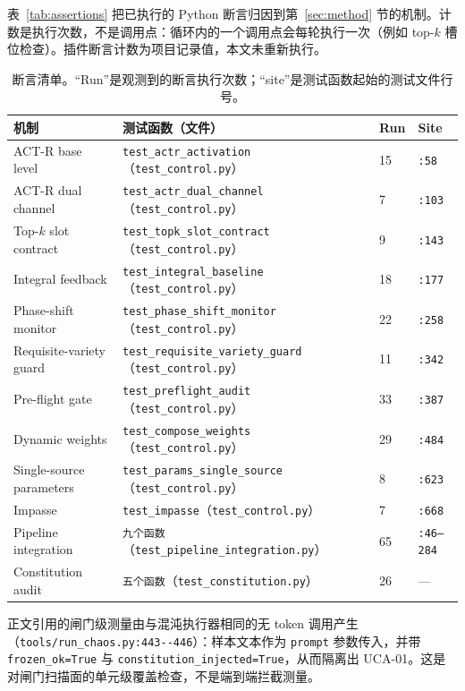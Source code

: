 表~\ref{tab:assertions} 把已执行的 Python 断言归因到第~\ref{sec:method} 节的机制。计数是执行次数，不是调用点：循环内的一个调用点会每轮执行一次（例如 top-$k$ 槽位检查）。插件断言计数为项目记录值，本文未重新执行。

\begin{table}[t]
\centering\footnotesize
\caption{断言清单。“Run”是观测到的断言执行次数；“site”是测试函数起始的测试文件行号。}
\begin{tabular}{@{}p{}p{}p{}p{}@{}}
\toprule
机制 & 测试函数（文件） & Run & Site \\
\midrule
ACT-R base level & \texttt{test\_\allowbreak{}actr\_\allowbreak{}activation}（\texttt{test\_control.py}） & 15 & \texttt{:58} \\
ACT-R dual channel & \texttt{test\_\allowbreak{}actr\_\allowbreak{}dual\_\allowbreak{}channel}（\texttt{test\_control.py}） & 7 & \texttt{:103} \\
Top-$k$ slot contract & \texttt{test\_\allowbreak{}topk\_\allowbreak{}slot\_\allowbreak{}contract}（\texttt{test\_control.py}） & 9 & \texttt{:143} \\
Integral feedback & \texttt{test\_\allowbreak{}integral\_\allowbreak{}baseline}（\texttt{test\_control.py}） & 18 & \texttt{:177} \\
Phase-shift monitor & \texttt{test\_\allowbreak{}phase\_\allowbreak{}shift\_\allowbreak{}monitor}（\texttt{test\_control.py}） & 22 & \texttt{:258} \\
Requisite-variety guard & \texttt{test\_\allowbreak{}requisite\_\allowbreak{}variety\_\allowbreak{}guard}（\texttt{test\_control.py}） & 11 & \texttt{:342} \\
Pre-flight gate & \texttt{test\_\allowbreak{}preflight\_\allowbreak{}audit}（\texttt{test\_control.py}） & 33 & \texttt{:387} \\
Dynamic weights & \texttt{test\_\allowbreak{}compose\_\allowbreak{}weights}（\texttt{test\_control.py}） & 29 & \texttt{:484} \\
Single-source parameters & \texttt{test\_\allowbreak{}params\_\allowbreak{}single\_\allowbreak{}source}（\texttt{test\_control.py}） & 8 & \texttt{:623} \\
Impasse & \texttt{test\_impasse}（\texttt{test\_control.py}） & 7 & \texttt{:668} \\
Pipeline integration & \texttt{九个函数}（\texttt{test\_\allowbreak{}pipeline\_\allowbreak{}integration.\allowbreak{}py}） & 65 & \texttt{:46--284} \\
Constitution audit & \texttt{五个函数}（\texttt{test\_\allowbreak{}constitution.\allowbreak{}py}） & 26 & --- \\
\bottomrule
\end{tabular}
\end{table}

正文引用的闸门级测量由与混沌执行器相同的无 token 调用产生（\texttt{tools/\allowbreak{}run\_\allowbreak{}chaos.\allowbreak{}py:\allowbreak{}443-\allowbreak{}-\allowbreak{}446}）：样本文本作为 \texttt{prompt} 参数传入，并带 \texttt{frozen\_ok=True} 与 \texttt{constitution\_\allowbreak{}injected=True}，从而隔离出 UCA-01。这是对闸门扫描面的单元级覆盖检查，不是端到端拦截测量。
